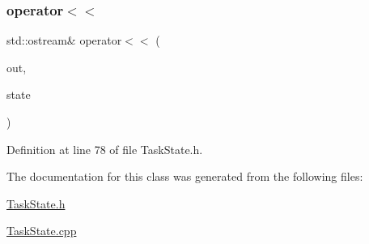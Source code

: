 \subsubsection{\texorpdfstring{operator$<$$<$}{operator<<}}
{\footnotesize\ttfamily std\+::ostream\& operator$<$$<$ (\begin{DoxyParamCaption}\item[{std\+::ostream \&}]{out,  }\item[{const \hyperlink{classocra_1_1TaskState}{Task\+State} \&}]{state }\end{DoxyParamCaption})\hspace{0.3cm}{\ttfamily [friend]}}



Definition at line 78 of file Task\+State.\+h.



The documentation for this class was generated from the following files\+:\begin{DoxyCompactItemize}
\item 
\hyperlink{TaskState_8h}{Task\+State.\+h}\item 
\hyperlink{TaskState_8cpp}{Task\+State.\+cpp}\end{DoxyCompactItemize}
